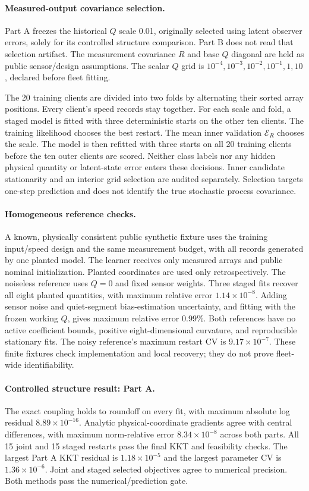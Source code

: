 \paragraph{Measured-output covariance selection.}
Part A freezes the historical $Q$ scale 0.01, originally selected using latent
observer errors, solely for its controlled structure comparison. Part B does
not read that selection artifact. The measurement covariance $R$ and base
$Q$ diagonal are held as public sensor/design assumptions. The scalar $Q$
grid is $10^{-4},10^{-3},10^{-2},10^{-1},1,10$, declared before fleet fitting.

The 20 training clients are divided into two folds by alternating their
sorted array positions. Every client's speed records stay together. For
each scale and fold, a staged model is fitted with three deterministic starts
on the other ten clients. The training likelihood chooses the best restart.
The mean inner validation $\mathcal E_R$ chooses the scale. The model is then
refitted with three starts on all 20 training clients before the ten outer
clients are scored. Neither class labels nor any hidden physical quantity or
latent-state error enters these decisions. Inner candidate stationarity and
an interior grid selection are audited separately. Selection targets one-step
prediction and does not identify the true stochastic process covariance.

\paragraph{Homogeneous reference checks.}
A known, physically consistent public synthetic fixture uses the training
input/speed design and the same measurement budget, with all records generated
by one planted model. The learner receives only measured arrays and public
nominal initialization. Planted coordinates are used only retrospectively.
The noiseless reference uses $Q=0$ and fixed sensor weights. Three staged fits
recover all eight planted quantities, with maximum relative error
$1.14\times10^{-8}$. Adding sensor noise and quiet-segment bias-estimation
uncertainty, and fitting with the frozen working $Q$, gives maximum relative
error 0.99\%. Both references have no active coefficient bounds, positive
eight-dimensional curvature, and reproducible stationary fits. The noisy
reference's maximum restart CV is $9.17\times10^{-7}$. These finite fixtures
check implementation and local recovery; they do not prove fleet-wide
identifiability.

\paragraph{Controlled structure result: Part A.}
The exact coupling holds to roundoff on every fit, with maximum absolute log
residual $8.89\times10^{-16}$. Analytic physical-coordinate gradients agree
with central differences, with maximum norm-relative error
$8.34\times10^{-8}$ across both parts. All 15 joint and 15 staged restarts
pass the final KKT and feasibility checks. The largest Part A KKT residual
is $1.18\times10^{-5}$ and the largest parameter CV is
$1.36\times10^{-6}$. Joint and staged selected objectives agree to numerical
precision. Both methods pass the numerical/prediction gate.

